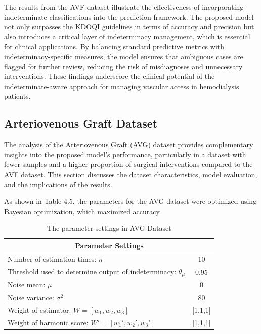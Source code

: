 The results from the AVF dataset illustrate the effectiveness of incorporating indeterminate classifications into the prediction framework. The proposed model not only surpasses the KDOQI guidelines in terms of accuracy and precision but also introduces a critical layer of indeterminacy management, which is essential for clinical applications. By balancing standard predictive metrics with indeterminacy-specific measures, the model ensures that ambiguous cases are flagged for further review, reducing the risk of misdiagnoses and unnecessary interventions. These findings underscore the clinical potential of the indeterminate-aware approach for managing vascular access in hemodialysis patients.

\subsection{Arteriovenous Graft Dataset}%

The analysis of the Arteriovenous Graft (AVG) dataset provides complementary insights into the proposed model's performance, particularly in a dataset with fewer samples and a higher proportion of surgical interventions compared to the AVF dataset. This section discusses the dataset characteristics, model evaluation, and the implications of the results.

As shown in Table 4.5, the parameters for the AVG dataset were optimized using Bayesian optimization, which maximized accuracy. 

\begin{table}[H]
    \centering
    \caption{The parameter settings in AVG Dataset}
    \renewcommand{\arraystretch}{1} %
    \begin{tabular}[h]{lc} \hline 
        \multicolumn{2}{c}{Parameter Settings} \\ \hline
        Number of estimation times: \(n\) & 10\\ 
        Threshold used to determine output of indeterminacy: \(\theta_{\mu}\) &  0.95\\ 
        Noise mean: \(\mu\) & 0\\ 
        Noise variance: \(\sigma^2\) & 80\\
        Weight of estimator: \(W=[w_{1},w_{2},w_{3}]\) & [1,1,1]\\
        Weight of harmonic score: \(W'=[w_1',w_2',w_3']\) & [1,1,1] \\ \hline 
    \end{tabular}
    \label{tab:Experimental_Config_AVG}
\end{table}


